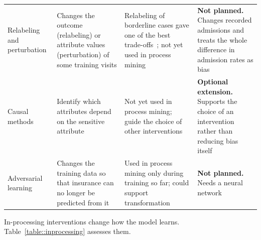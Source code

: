 \begin{table}[htbp]
\begin{tabularx}{\textwidth}{@{}>{\raggedright\arraybackslash}p{2.5cm}>{\raggedright\arraybackslash}X>{\raggedright\arraybackslash}X>{\raggedright\arraybackslash}X@{}}
    Relabeling and perturbation & Changes the outcome (relabeling) or attribute values (perturbation) of some training visits & Relabeling of borderline cases gave one of the best trade-offs~\cite{kamiran2012data}; not yet used in process mining~\cite{revoredo2026fairpm} & \textbf{Not planned.} Changes recorded admissions and treats the whole difference in admission rates as bias \\ \addlinespace[0.8ex]
    Causal methods & Identify which attributes depend on the sensitive attribute & Not yet used in process mining; guide the choice of other interventions~\cite{revoredo2026fairpm} & \textbf{Optional extension.} Supports the choice of an intervention rather than reducing bias itself \\ \addlinespace[0.8ex]
    Adversarial learning & Changes the training data so that insurance can no longer be predicted from it & Used in process mining only during training so far; could support transformation~\cite{revoredo2026fairpm} & \textbf{Not planned.} Needs a neural network \\
    \bottomrule
  \end{tabularx}
\end{table}

In-processing interventions change how the model learns. Table~\ref{table::inprocessing} assesses them.

